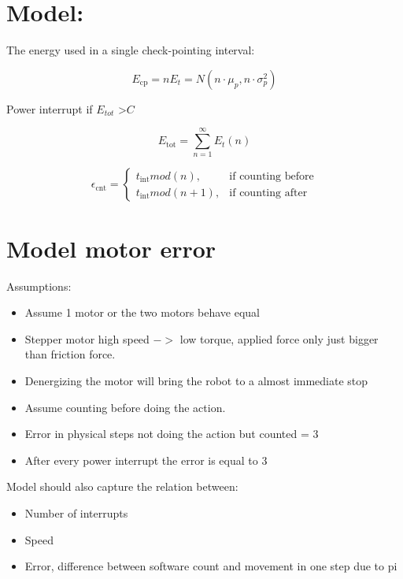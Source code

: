 \documentclass[11pt,twoside,a4paper]{article}
\begin{document}
\newpage

\section{Model:}

The energy used in a single check-pointing interval:

\begin{equation}
E_{\text{cp}} = nE_t = N(n\cdot{}\mu_p, n\cdot{}\sigma_p^2)
\end{equation}

Power interrupt if $E_{tot}$ \textgreater $C$

\begin{equation}
E_{\text{tot}}= \sum_{n=1}^{\infty} E_{t}(n)
\end{equation}

\begin{equation}
\epsilon_{\text{cnt}} =
    \begin{cases}
      t_{\text{int}} mod(n), & \text{if } \text{counting before} \\
      t_{\text{int}} mod(n + 1), & \text{if } \text{counting after}
    \end{cases}
\end{equation}
\newpage

\section{Model motor error}

Assumptions: \\
\begin{itemize}
\item Assume 1 motor or the two motors behave equal
\item Stepper motor high speed $->$ low torque, applied force only just bigger than friction force.
\item Denergizing the motor will bring the robot to a almost immediate stop
\item Assume counting before doing the action.
\item Error in physical steps not doing the action but counted = 3
\item After every power interrupt the error is equal to 3
\end{itemize}


Model should also capture the relation between: \\
\begin{itemize}
\item Number of interrupts
\item Speed
\item Error, difference between software count and movement in one step due to pi
\end{itemize}
\end{document}
